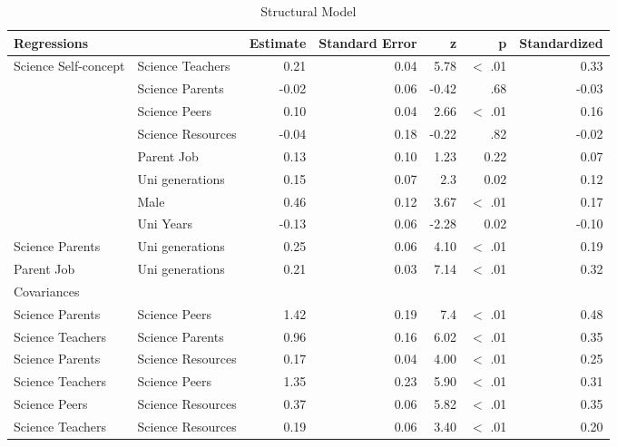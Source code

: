 \begin{landscape}
\begin{table}[ht]
\caption{Structural Model} 

\centering
\begin{tabular}{llrrrrr}
  \hline
 Regressions &  & Estimate & Standard Error & z & p & Standardized \\ 
  \hline

  Science Self-concept & Science Teachers & 0.21 & 0.04 & 5.78 & $<$ .01 & 0.33 \\ 
   & Science Parents & -0.02 & 0.06 & -0.42 & .68 & -0.03 \\ 
   & Science Peers & 0.10 & 0.04 & 2.66 & $<$ .01 & 0.16 \\ 
   & Science Resources & -0.04 & 0.18 & -0.22 & .82 & -0.02 \\ 
   & Parent Job & 0.13 & 0.10 & 1.23 & 0.22 & 0.07 \\ 
   & Uni generations & 0.15 & 0.07 & 2.3 & 0.02 & 0.12 \\ 
   & Male & 0.46 & 0.12 & 3.67 & $<$ .01 & 0.17 \\ 
   & Uni Years & -0.13 & 0.06 & -2.28 & 0.02 & -0.10 \\ 
  Science Parents & Uni generations & 0.25 & 0.06 & 4.10 & $<$ .01 & 0.19 \\ 
  Parent Job & Uni generations & 0.21 & 0.03 & 7.14 & $<$ .01 & 0.32 \\ 
  \hline
Covariances &  &  &  &  & &  \\ 
  \hline
  Science Parents & Science Peers & 1.42 & 0.19 & 7.4 & $<$ .01 & 0.48 \\ 
  Science Teachers & Science Parents & 0.96 & 0.16 & 6.02 & $<$ .01 & 0.35 \\ 
  Science Parents & Science Resources & 0.17 & 0.04 & 4.00 & $<$ .01 & 0.25 \\ 
  Science Teachers & Science Peers & 1.35 & 0.23 & 5.90 & $<$ .01 & 0.31 \\ 
  Science Peers & Science Resources & 0.37 & 0.06 & 5.82 & $<$ .01 & 0.35 \\ 
  Science Teachers & Science Resources & 0.19 & 0.06 & 3.40 & $<$ .01 & 0.20 \\ 
   

\end{tabular}
\end{table}
\end{landscape}
